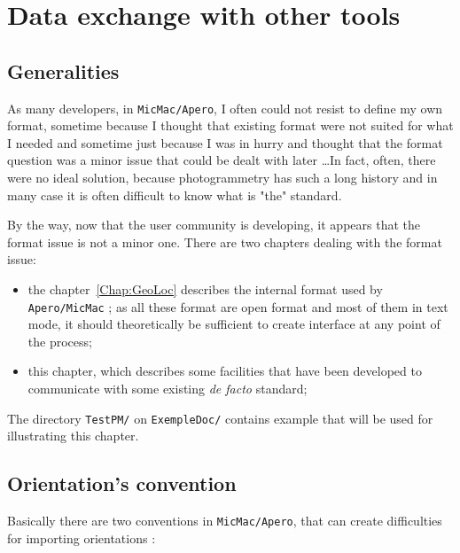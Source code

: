 \chapter{Data exchange with other tools}

\section{Generalities}

As many developers, in {\tt MicMac/Apero}, I often could not resist to 
define my own format, sometime because I thought that existing 
format were not suited for what I needed and sometime just because I was in
hurry and thought that the format question was a minor issue that could be
dealt with later \dots In fact, often, there were no ideal solution, because 
photogrammetry has such a long history and in many case it is often difficult to
know what is "the" standard.

\vspace{\baselineskip}
By the way, now that the user community is developing, it appears that the format issue
is not a minor one. There are two chapters dealing with the format issue:

\begin{itemize}
   \item  the chapter~\ref{Chap:GeoLoc} describes the internal format used
          by {\tt Apero/MicMac} ; as all these
          format are open format and most of them in text mode, it should theoretically be sufficient
          to create interface at any point of the process;

   \item  this chapter, which describes some facilities that have been developed to communicate
          with some existing \emph{de facto} standard;
\end{itemize}

The directory {\tt TestPM/} on {\tt ExempleDoc/} contains example that will be used for
illustrating this chapter.


\section{Orientation's convention}

Basically there are two conventions in {\tt MicMac/Apero}, that can create
difficulties for importing orientations :

